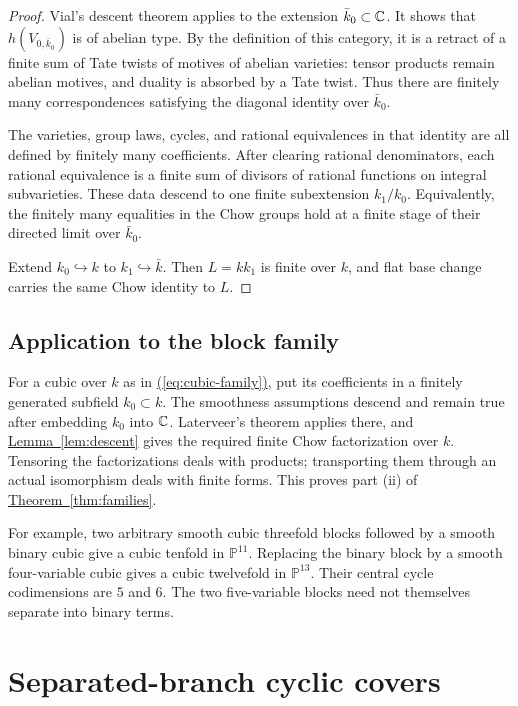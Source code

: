 \documentclass[11pt,a4paper]{article}
\theoremstyle{definition}
\theoremstyle{remark}\newtheorem{remark}[theorem]{Remark}
\numberwithin{equation}{section}
\newcommand{\PP}{\mathbb P}\newcommand{\LL}{\mathbb L}
\newcommand{\thmref}[1]{\hyperref[#1]{\textcolor{resultlink}{Theorem~\ref*{#1}}}}
\newcommand{\lemref}[1]{\hyperref[#1]{\textcolor{resultlink}{Lemma~\ref*{#1}}}}
\renewcommand{\eqref}[1]{\hyperref[#1]{\textcolor{equationlink}{(\ref*{#1})}}}
\begin{document}
\begin{proof}
Vial's descent theorem \cite[Theorem 1 and \S1.1]{Vial} applies
to the extension $\bar k_0\subset\mathbb C$. It shows that
$h(V_{0,\bar k_0})$ is of abelian type. By the definition of
this category, it is a retract of a finite sum of Tate twists
of motives of abelian varieties: tensor products remain abelian
motives, and duality is absorbed by a Tate twist. Thus there
are finitely many correspondences satisfying the diagonal
identity over $\bar k_0$.

The varieties, group laws, cycles, and rational equivalences in
that identity are all defined by finitely many coefficients.
After clearing rational denominators, each rational equivalence
is a finite sum of divisors of rational functions on integral
subvarieties. These data descend to one finite subextension
$k_1/k_0$. Equivalently, the finitely many equalities in the
Chow groups hold at a finite stage of their directed limit over
$\bar k_0$.

Extend $k_0\hookrightarrow k$ to $k_1\hookrightarrow\bar k$.
Then $L=kk_1$ is finite over $k$, and flat base change carries
the same Chow identity to $L$.
\end{proof}

\subsection{Application to the block family}\label{proof:cubic}

For a cubic over $k$ as in \eqref{eq:cubic-family}, put its
coefficients in a finitely generated subfield $k_0\subset k$.
The smoothness assumptions descend and remain true after
embedding $k_0$ into $\mathbb C$. Laterveer's theorem applies there,
and \lemref{lem:descent} gives the required finite Chow
factorization over $k$. Tensoring the factorizations deals
with products; transporting them through an actual isomorphism
deals with finite forms. This proves part (ii) of
\thmref{thm:families}.

For example, two arbitrary smooth cubic threefold blocks followed
by a smooth binary cubic give a cubic tenfold in $\PP^{11}$.
Replacing the binary block by a smooth four-variable cubic
gives a cubic twelvefold in $\PP^{13}$. Their central cycle
codimensions are $5$ and $6$. The two five-variable blocks
need not themselves separate into binary terms.

\section{Separated-branch cyclic covers}\label{sec:cyclic}
\end{document}
